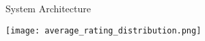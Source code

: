 
\begin{frame}{System Architecture}
\begin{center}
  \texttt{[image: average\_rating\_distribution.png]}
\end{center}
\end{frame}
